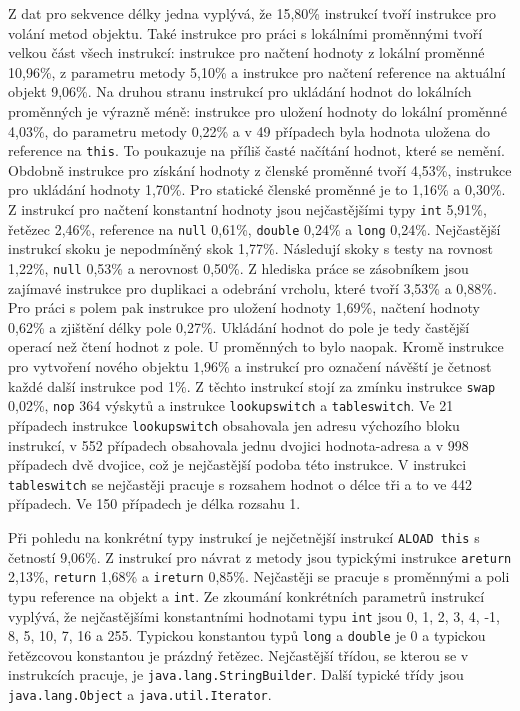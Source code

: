 
Z dat pro sekvence délky jedna vyplývá, že 15,80\% instrukcí tvoří instrukce pro volání metod objektu. Také instrukce pro práci s lokálními proměnnými tvoří velkou část všech instrukcí: instrukce pro načtení hodnoty z lokální proměnné 10,96\%, z parametru metody 5,10\% a instrukce pro načtení reference na aktuální objekt 9,06\%. Na druhou stranu instrukcí pro ukládání hodnot do lokálních proměnných je výrazně méně: instrukce pro uložení hodnoty do lokální proměnné 4,03\%, do parametru metody 0,22\% a v 49 případech byla hodnota uložena do reference na \texttt{this}. To poukazuje na příliš časté načítání hodnot, které se nemění. Obdobně instrukce pro získání hodnoty z členské proměnné tvoří 4,53\%, instrukce pro ukládání hodnoty 1,70\%. Pro statické členské proměnné je to 1,16\% a 0,30\%. Z instrukcí pro načtení konstantní hodnoty jsou nejčastějšími typy \texttt{int} 5,91\%, řetězec 2,46\%, reference na \texttt{null} 0,61\%, \texttt{double} 0,24\% a \texttt{long} 0,24\%. Nejčastější instrukcí skoku je nepodmíněný skok 1,77\%. Následují skoky s testy na rovnost 1,22\%, \texttt{null} 0,53\% a nerovnost 0,50\%. Z hlediska práce se zásobníkem jsou zajímavé instrukce pro duplikaci a odebrání vrcholu, které tvoří 3,53\% a 0,88\%. Pro práci s polem pak instrukce pro uložení hodnoty 1,69\%, načtení hodnoty 0,62\% a zjištění délky pole 0,27\%. Ukládání hodnot do pole je tedy častější operací než čtení hodnot z pole. U proměnných to bylo naopak. Kromě instrukce pro vytvoření nového objektu 1,96\% a instrukcí pro označení návěští je četnost každé další instrukce pod 1\%. Z těchto instrukcí stojí za zmínku instrukce \texttt{swap} 0,02\%, \texttt{nop} 364 výskytů a instrukce \texttt{lookupswitch} a \texttt{tableswitch}. Ve 21 případech instrukce \texttt{lookupswitch} obsahovala jen adresu výchozího bloku instrukcí, v 552 případech obsahovala jednu dvojici hodnota-adresa a v 998 případech dvě dvojice, což je nejčastější podoba této instrukce. V instrukci \texttt{tableswitch} se nejčastěji pracuje s rozsahem hodnot o délce tři a to ve 442 případech. Ve 150 případech je délka rozsahu 1.


Při pohledu na konkrétní typy instrukcí je nejčetnější instrukcí \texttt{ALOAD this} s četností 9,06\%. Z instrukcí pro návrat z metody jsou typickými instrukce \texttt{areturn} 2,13\%, \texttt{return} 1,68\% a \texttt{ireturn} 0,85\%. Nejčastěji se pracuje s proměnnými a poli typu reference na objekt a \texttt{int}. Ze zkoumání konkrétních parametrů instrukcí vyplývá, že nejčastějšími konstantními hodnotami typu \texttt{int} jsou 0, 1, 2, 3, 4, -1, 8, 5, 10, 7, 16 a 255. Typickou konstantou typů \texttt{long} a \texttt{double} je 0 a typickou řetězcovou konstantou je prázdný řetězec. Nejčastější třídou, se kterou se v instrukcích pracuje, je \texttt{java.lang.StringBuilder}. Další typické třídy jsou \texttt{java.lang.Object} a \texttt{java.util.Iterator}.

